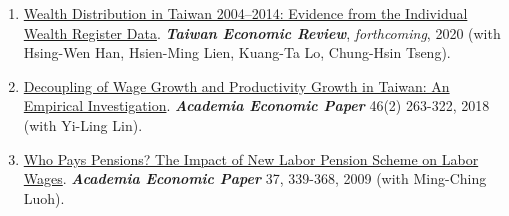 \documentclass[10pt,letterpaper]{article}
\renewenvironment{itemize}{
  \begin{list}{}{
      \setlength{\leftmargin}{1.5em}
      \setlength{\itemsep}{0.25em}
      \setlength{\parskip}{0pt}
      \setlength{\parsep}{0.25em}
    }
}{
  \end{list}
}
\begin{document}
\begin{enumerate}
\item
\href{http://www.econ.ntu.edu.tw/ter/new/data/new/forthcoming/108-015.pdf}{Wealth Distribution in Taiwan 2004–2014: Evidence from the Individual Wealth Register Data}. \textit{\textbf{Taiwan Economic Review}}, \textit{forthcoming}, 2020 (with Hsing-Wen Han, Hsien-Ming Lien, Kuang-Ta Lo, Chung-Hsin Tseng).

\item
\href{https://www.dropbox.com/s/z5b267cu72o6xlg/tot_wage_v63_olo_revised.pdf?dl=0}{Decoupling of Wage Growth and Productivity Growth in Taiwan: An Empirical Investigation}. \textit{\textbf{Academia Economic Paper}} 46(2) 263-322, 2018 (with Yi-Ling Lin).   
\item \href{http://www.econ.sinica.edu.tw/UpFiles/2013090214141704234/Periodicals_Pdf2013090215152407682/aep37-3-3.pdf}{Who Pays Pensions? The Impact of New Labor Pension Scheme on Labor Wages}.
  \textit{\textbf{Academia Economic Paper}} 37, 339-368, 2009 (with Ming-Ching Luoh).



\end{enumerate}










\end{document}
